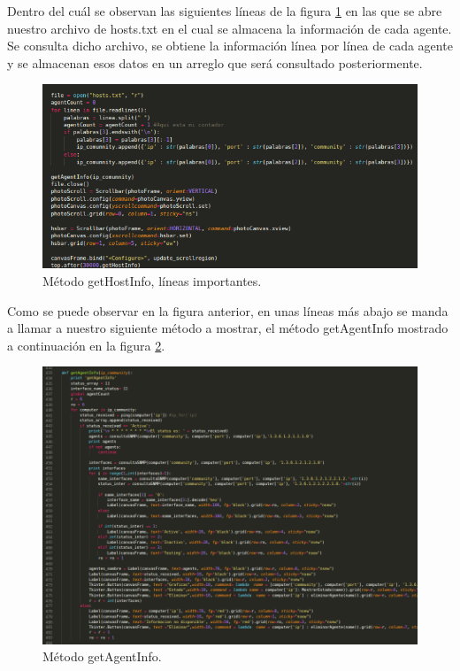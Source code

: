 Dentro del cuál se observan las siguientes líneas de la figura \ref{image:principal1} en las que se abre nuestro archivo de hosts.txt en el cual se almacena la información de cada agente. Se consulta dicho archivo, se obtiene la información línea por línea de cada agente y se almacenan esos datos en un arreglo que será consultado posteriormente. 
\FloatBarrier
\begin{figure}[htbp!]
		\centering
	\includegraphics[width=.9 \textwidth]{images/principal1}
		\caption{Método getHostInfo, líneas importantes.}		\label{image:principal1}
\end{figure}
\FloatBarrier

Como se puede observar en la figura anterior, en unas líneas más abajo se manda a llamar a nuestro siguiente método a mostrar, el método getAgentInfo mostrado a continuación en la figura \ref{image:principal2}.
\FloatBarrier
\begin{figure}[htbp!]
		\centering
	\includegraphics[width=.75 \textwidth]{images/principal2}
		\caption{Método getAgentInfo.}		\label{image:principal2}
\end{figure}
\FloatBarrier


